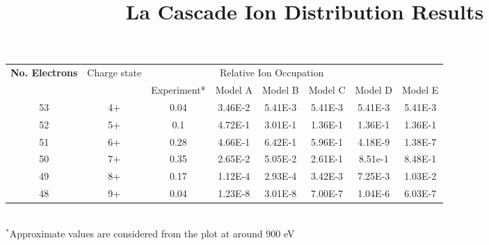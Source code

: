 \documentclass{article}
\title{La Cascade Ion Distribution Results}
\begin{document}
\maketitle

\begin{table}[h]
\centering
    \begin{tabular}{cccccccc}
    \hline
    \multirow{2}{*}{\textbf{No. Electrons}} & \multirow{2}{*}{Charge state} & \multicolumn{5}{c}{Relative Ion Occupation}   \\ \cline{3-8}
                           &                       & Experiment*  & Model A   & Model B  & Model C & Model D  & Model E     \\ \hline
    53                     & 4+                    & 0.04         & 3.46E-2   & 5.41E-3  & 5.41E-3 & 5.41E-3  & 5.41E-3     \\
    52                     & 5+                    & 0.1          & 4.72E-1   & 3.01E-1  & 1.36E-1 & 1.36E-1  & 1.36E-1     \\
    51                     & 6+                    & 0.28         & 4.66E-1   & 6.42E-1  & 5.96E-1 & 4.18E-9  & 1.38E-7     \\
    50                     & 7+                    & 0.35         & 2.65E-2   & 5.05E-2  & 2.61E-1 & 8.51e-1  & 8.48E-1     \\
    49                     & 8+                    & 0.17         & 1.12E-4   & 2.93E-4  & 3.42E-3 & 7.25E-3  & 1.03E-2     \\
    48                     & 9+                    & 0.04         & 1.23E-8   & 3.01E-8  & 7.00E-7 & 1.04E-6  & 6.03E-7     \\  \hline    
    \end{tabular}
    \\ $^*$Approximate values are considered from the plot at around 900 eV 
\end{table}
\end{document}
